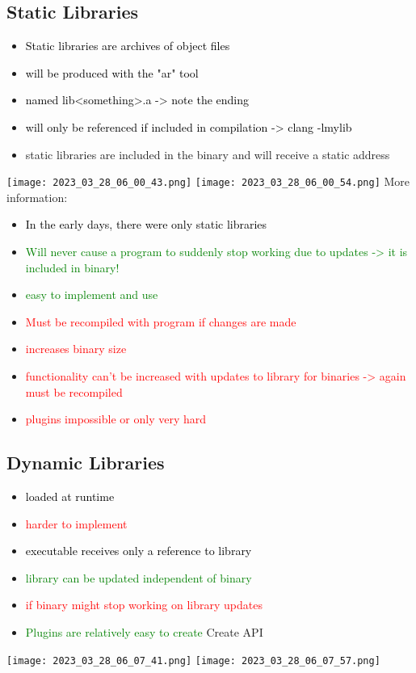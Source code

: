 \documentclass[main.tex,fontsize=8pt,paper=a4,paper=portrait,DIV=calc,]{scrartcl}
\begin{document}
\subsection{Static Libraries}
\begin{itemize}
\item \textcolor{black}{Static libraries are archives of object files}
\item \textcolor{black}{will be produced with the "ar" tool}
\item \textcolor{black}{named lib<something>.a -> note the ending}
\item \textcolor{black}{will only be referenced if included in compilation -> clang -lmylib}
\item static libraries are included in the binary and will receive a static address
\end{itemize} 
\texttt{[image: 2023\_03\_28\_06\_00\_43.png]}
\texttt{[image: 2023\_03\_28\_06\_00\_54.png]}\newline
More information:
\begin{itemize}
\item \textcolor{black}{In the early days, there were only static libraries}
\item \textcolor{green}{Will never cause a program to suddenly stop working due to updates -> it is included in binary!}
\item \textcolor{green}{easy to implement and use}
\item \textcolor{red}{Must be recompiled with program if changes are made}
\item \textcolor{red}{increases binary size}
\item \textcolor{red}{functionality can't be increased with updates to library for binaries -> again must be recompiled}
  \item \textcolor{red}{plugins impossible or only very hard}
\end{itemize} 

\subsection{Dynamic Libraries}
\begin{itemize}
\item \textcolor{black}{loaded at runtime}
\item \textcolor{red}{harder to implement}
\item \textcolor{black}{executable receives only a reference to library}
\item \textcolor{green}{library can be updated independent of binary}
\item \textcolor{red}{if binary might stop working on library updates} 
\item \textcolor{green}{Plugins are relatively easy to create}\newline
  Create API
\end{itemize} 
\texttt{[image: 2023\_03\_28\_06\_07\_41.png]}
\texttt{[image: 2023\_03\_28\_06\_07\_57.png]}
\end{document}
